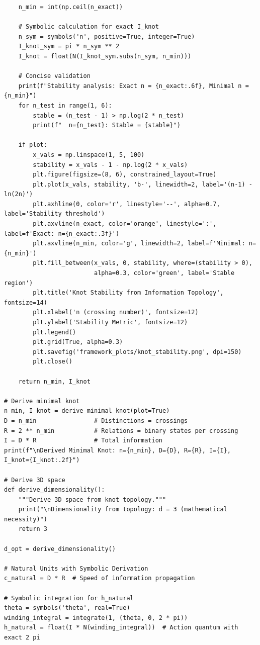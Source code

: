 \documentclass{article}
\begin{document}
\begin{verbatim}
    n_min = int(np.ceil(n_exact))
    
    # Symbolic calculation for exact I_knot
    n_sym = symbols('n', positive=True, integer=True)
    I_knot_sym = pi * n_sym ** 2
    I_knot = float(N(I_knot_sym.subs(n_sym, n_min)))
    
    # Concise validation
    print(f"Stability analysis: Exact n = {n_exact:.6f}, Minimal n = {n_min}")
    for n_test in range(1, 6):
        stable = (n_test - 1) > np.log(2 * n_test)
        print(f"  n={n_test}: Stable = {stable}")
    
    if plot:
        x_vals = np.linspace(1, 5, 100)
        stability = x_vals - 1 - np.log(2 * x_vals)
        plt.figure(figsize=(8, 6), constrained_layout=True)
        plt.plot(x_vals, stability, 'b-', linewidth=2, label='(n-1) - ln(2n)')
        plt.axhline(0, color='r', linestyle='--', alpha=0.7, label='Stability threshold')
        plt.axvline(n_exact, color='orange', linestyle=':', label=f'Exact: n={n_exact:.3f}')
        plt.axvline(n_min, color='g', linewidth=2, label=f'Minimal: n={n_min}')
        plt.fill_between(x_vals, 0, stability, where=(stability > 0),
                         alpha=0.3, color='green', label='Stable region')
        plt.title('Knot Stability from Information Topology', fontsize=14)
        plt.xlabel('n (crossing number)', fontsize=12)
        plt.ylabel('Stability Metric', fontsize=12)
        plt.legend()
        plt.grid(True, alpha=0.3)
        plt.savefig('framework_plots/knot_stability.png', dpi=150)
        plt.close()

    return n_min, I_knot

# Derive minimal knot
n_min, I_knot = derive_minimal_knot(plot=True)
D = n_min                # Distinctions = crossings
R = 2 ** n_min           # Relations = binary states per crossing
I = D * R                # Total information
print(f"\nDerived Minimal Knot: n={n_min}, D={D}, R={R}, I={I}, I_knot={I_knot:.2f}")

# Derive 3D space
def derive_dimensionality():
    """Derive 3D space from knot topology."""
    print("\nDimensionality from topology: d = 3 (mathematical necessity)")
    return 3

d_opt = derive_dimensionality()

# Natural Units with Symbolic Derivation
c_natural = D * R  # Speed of information propagation

# Symbolic integration for h_natural
theta = symbols('theta', real=True)
winding_integral = integrate(1, (theta, 0, 2 * pi))
h_natural = float(I * N(winding_integral))  # Action quantum with exact 2 pi


\end{verbatim}
\end{document}
